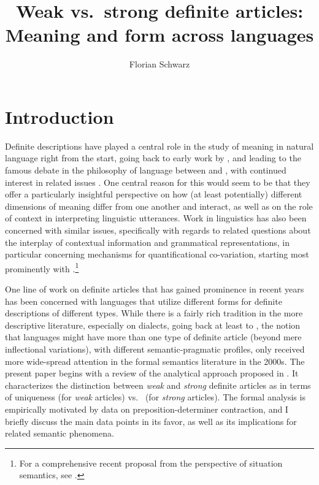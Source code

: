 \documentclass[output=paper
,modfonts
,nonflat]{langscibook}
\title{Weak vs.\ strong definite articles: Meaning and form across languages}
\author{Florian Schwarz\affiliation{University of Pennsylvania}
}
\begin{document}
\maketitle
\section{Introduction}
Definite descriptions have played a central role in the study of
meaning in natural language right from the start, going back to
early work by \citet{Frege1892}, and leading to the famous debate in
the philosophy of language between
\citet{Russell1905} and \citet{Strawson1950}, with continued interest
in related issues \citep[for an extensive collection, see][]{Reimer2004} . One central reason for
this would seem to be that they offer a particularly insightful
perspective on how (at least potentially) different dimensions of
meaning differ from one another and interact, as well as on the role
of context in interpreting linguistic utterances. Work
in linguistics has also been concerned with similar issues,
specifically with regards to related questions about the interplay
of contextual information and grammatical representations,
in particular concerning mechanisms for quantificational
co-variation, starting most prominently
with \citet{Heim1982}.\footnote{For a comprehensive recent proposal from the perspective of situation semantics, see \citet{Elbourne2013}.}


One line of work on definite articles that has gained prominence in
recent years has been concerned with languages that utilize different
forms for definite descriptions of different types. While there is a
fairly rich tradition in the more descriptive literature, especially
on  dialects, going back at least to \citet{Heinrichs1954}, the
notion that languages might have more than one type of definite
article (beyond mere inflectional variations), with different
semantic-pragmatic profiles, only received more wide-spread attention
in the formal semantics literature in the 2000s. The present paper
begins with a review of the analytical approach proposed in
\citet{Schwarz2009}. It characterizes the distinction between \textit{weak}
and \textit{strong} definite articles as in terms of
uniqueness (for \textit{weak} articles) vs.\  (for \textit{strong}
articles). The formal analysis is empirically motivated by  data on
 preposition-determiner contraction, and I briefly discuss the
main data points in its favor, as well as its implications for related
semantic phenomena. 
\end{document}
